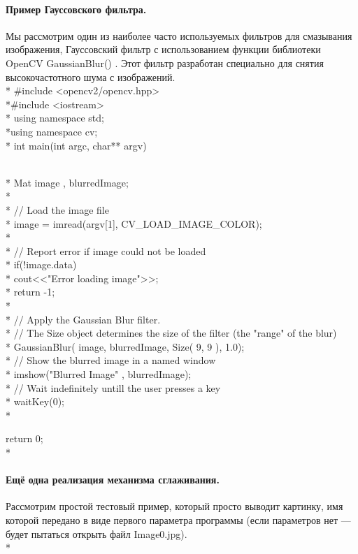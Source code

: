 \documentclass[a4paper,12pt]{article}
\begin{document}
\paragraph{Пример Гауссовского фильтра.}
Мы рассмотрим один из наиболее часто используемых фильтров для смазывания изображения, Гауссовский фильтр с использованием функции библиотеки OpenCV GaussianBlur() . Этот фильтр разработан специально для снятия высокочастотного шума с изображений. \\* 
\#include <opencv2/opencv.hpp>
\\*\#include <iostream>\\*
using namespace std;
\\*using namespace cv;\\* int main(int argc, char** argv){\\* Mat image , blurredImage;
\\*
\\*    // Load the image file\\*
    image = imread(argv[1], CV\_LOAD\_IMAGE\_COLOR);
\\*
\\*    // Report error if image could not be loaded
\\*    if(!image.data){ \
\\*        cout<<"Error loading image">>;
\\*        return -1;
\\*    }\\* // Apply the Gaussian Blur filter. 
\\*    // The Size object determines the size of the filter (the "range" of the blur)\\*
    GaussianBlur( image, blurredImage, Size( 9, 9 ), 1.0);\\* // Show the blurred image in a named window\\* 
imshow("Blurred Image" , blurredImage);\\*  // Wait indefinitely untill the user presses a key
\\*    waitKey(0);\\* 

return 0;\\*}
\newpage
\paragraph{Ещё одна реализация механизма сглаживания.}
 Рассмотрим простой тестовый пример, который просто выводит картинку, имя которой передано в виде первого параметра программы (если параметров нет — будет пытаться открыть файл Image0.jpg).\\*
\end{document}
